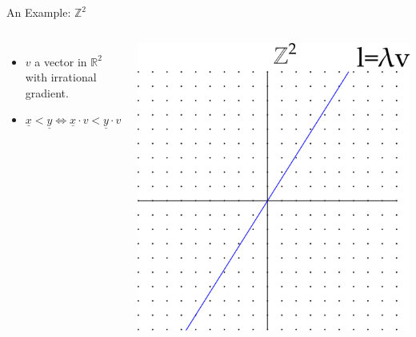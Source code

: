 \documentclass{beamer}
\begin{document}

\begin{frame}{An Example: $\mathbb{Z}^2$}
	\begin{columns}
		\begin{itemize}
		\item $v$ a vector in $\mathbb{R}^2$ with irrational gradient.
		
		\item $\underline{x}<\underline{y} \iff \underline{x} \cdot v < \underline{y} \cdot v$\
		\end{itemize}
		\includegraphics[width=\linewidth]{Z2.png}
	\end{columns}
\end{frame}
\end{document}
